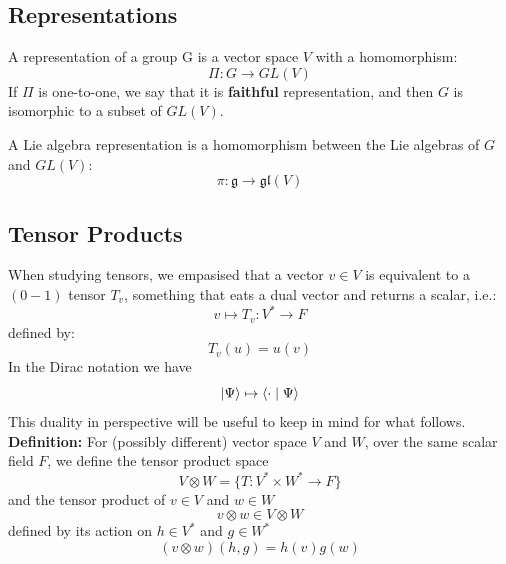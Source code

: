 \documentclass[12pt]{article}
\begin{document}
\subsection*{Representations}

A representation of a group G is a vector space $V$ with a
homomorphism:
$$\Pi: G \to GL(V)$$
If $\Pi$ is one-to-one, we say that
it is {\bf faithful} representation, and then $G$ is isomorphic to a
subset of $GL(V)$.

A Lie algebra representation is a homomorphism between the Lie
algebras of $G$ and $GL(V)$:
$$\pi: \mathfrak{g} \to \mathfrak{gl}(V)$$

\subsection*{Tensor Products}

When studying tensors, we empasised that a vector $v \in V$ is
equivalent to a $(0-1)$ tensor $T_v$, something
that eats a dual vector and returns a scalar, i.e.:
$$v \mapsto T_v:V^* \to F$$
defined by:
$$T_v(u) = u(v)$$
In the Dirac notation we have
$$\ket{\Psi} \mapsto \braket{ \cdot \mid \Psi}$$
This duality in perspective will be useful to keep in mind for what follows.\\[5pt]

\noindent
{\bf Definition:} For (possibly different) vector space $V$ and $W$, over the same scalar field $F$, we define the tensor product space
$$V \otimes W = \{T: V^* \times W^* \to F\}$$
and the tensor product of $v \in V$ and $w \in W$
$$v \otimes w \in V \otimes W$$
defined by its action on $h \in V^*$ and $g \in W^*$ 
$$(v \otimes w) (h, g) = h(v) g(w)$$
\end{document}
